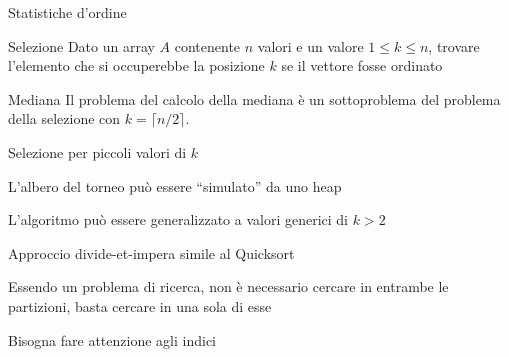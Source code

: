 \begin{frame}{Statistiche d'ordine}

\begin{block}{Selezione}
Dato un array $A$ contenente $n$ valori e un valore $1 \leq k \leq n$, 
trovare l'elemento che si occuperebbe la posizione $k$ se il vettore fosse ordinato
\end{block}

\medskip
\begin{block}{Mediana}
Il problema del calcolo della mediana è un sottoproblema del problema
della selezione con $k=\lceil n/2 \rceil$.
\end{block}

\end{frame}

\begin{frame}{Selezione per piccoli valori di $k$}

\BIL
\item L'albero del torneo può essere “simulato” da uno heap
\item L'algoritmo può essere generalizzato a valori generici di $k > 2$
\EIL

\end{frame}
	
\begin{frame}{}

\BIL
\item Approccio divide-et-impera simile al Quicksort
\item Essendo un problema di ricerca, non è necessario cercare in entrambe le partizioni, basta cercare in una sola di esse
\item Bisogna fare attenzione agli indici
\EIL

\end{frame}

